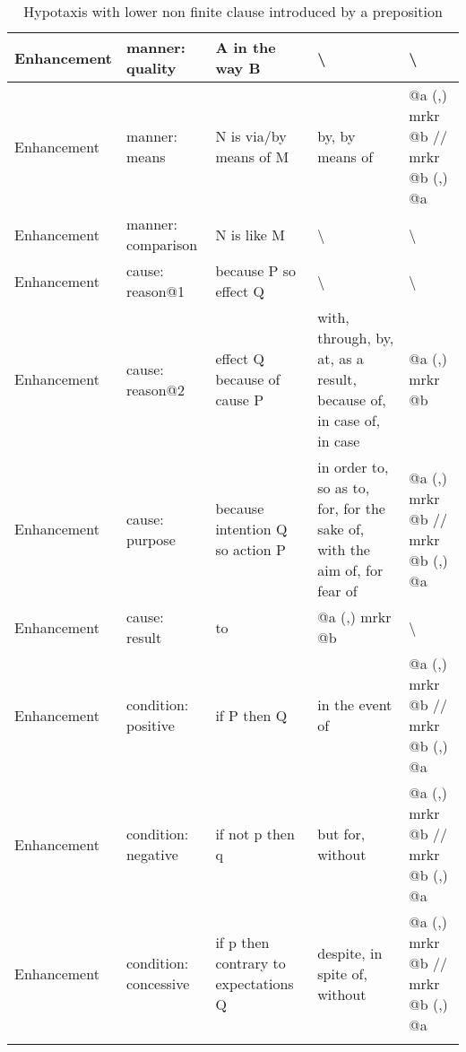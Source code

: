 \begin{landscape}
\begin{longtable}{|l|l|p{3cm}|p{5cm}|p{5cm}|}
			Enhancement & manner: quality        & A in the way B                       & \textbackslash                                                            & \textbackslash                             \\ \hline
			Enhancement & manner: means          & N is via/by means of M               & by, by means of                                                           & @a (,) mrkr @b // mrkr @b (,) @a           \\ \hline
			Enhancement & manner: comparison     & N is like M                          & \textbackslash                                                            & \textbackslash                             \\ \hline
			Enhancement & cause: reason@1        & because P so effect Q                & \textbackslash                                                            & \textbackslash                             \\ \hline
			Enhancement & cause: reason@2        & effect Q because of cause P          & with, through, by, at, as a result, because of, in case of, in case       & @a (,) mrkr @b                             \\ \hline
			Enhancement & cause: purpose         & because intention Q so action P      & in order to, so as to, for, for the sake of, with the aim of, for fear of & @a (,) mrkr @b // mrkr @b (,) @a           \\ \hline
			Enhancement & cause: result          & to                                   & @a (,) mrkr @b                                                            & \textbackslash                             \\ \hline
			Enhancement & condition: positive    & if P then Q                          & in the event of                                                           & @a (,) mrkr @b // mrkr @b (,) @a           \\ \hline
			Enhancement & condition: negative    & if not p then q                      & but for, without                                                          & @a (,) mrkr @b // mrkr @b (,) @a           \\ \hline
			Enhancement & condition: concessive  & if p then contrary to expectations Q & despite, in spite of, without                                             & @a (,) mrkr @b // mrkr @b (,) @a           \\ \hline
			
			\caption{Hypotaxis with lower non finite clause introduced by a preposition}
			\label{tab:hypotaxis-non-finite-preposition}
		\end{longtable}
	\end{landscape}
